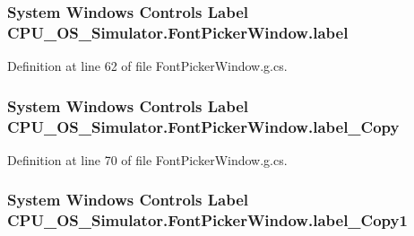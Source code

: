 \subsubsection[{label}]{\setlength{\rightskip}{0pt plus 5cm}System Windows Controls Label C\+P\+U\+\_\+\+O\+S\+\_\+\+Simulator.\+Font\+Picker\+Window.\+label\hspace{0.3cm}{\ttfamily [package]}}\label{class_c_p_u___o_s___simulator_1_1_font_picker_window_ada73b11773a6ec5fbddb19ee96bb131b}


Definition at line 62 of file Font\+Picker\+Window.\+g.\+cs.

\hypertarget{class_c_p_u___o_s___simulator_1_1_font_picker_window_a25630ec7b1b5e76da6c7296d267067c9}{}
\subsubsection[{label\+\_\+\+Copy}]{\setlength{\rightskip}{0pt plus 5cm}System Windows Controls Label C\+P\+U\+\_\+\+O\+S\+\_\+\+Simulator.\+Font\+Picker\+Window.\+label\+\_\+\+Copy\hspace{0.3cm}{\ttfamily [package]}}\label{class_c_p_u___o_s___simulator_1_1_font_picker_window_a25630ec7b1b5e76da6c7296d267067c9}


Definition at line 70 of file Font\+Picker\+Window.\+g.\+cs.

\hypertarget{class_c_p_u___o_s___simulator_1_1_font_picker_window_a8e7e6065c838bf76e919401eff15a2be}{}
\subsubsection[{label\+\_\+\+Copy1}]{\setlength{\rightskip}{0pt plus 5cm}System Windows Controls Label C\+P\+U\+\_\+\+O\+S\+\_\+\+Simulator.\+Font\+Picker\+Window.\+label\+\_\+\+Copy1\hspace{0.3cm}{\ttfamily [package]}}\label{class_c_p_u___o_s___simulator_1_1_font_picker_window_a8e7e6065c838bf76e919401eff15a2be}


